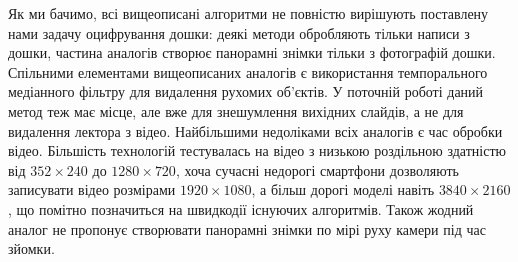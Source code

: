 \chapterConclusion

Як ми бачимо, всі вищеописані алгоритми не повністю вирішують поставлену нами задачу
оцифрування дошки: деякі методи обробляють тільки написи з дошки,
частина аналогів створює панорамні знімки тільки з фотографій дошки.
Спільними елементами вищеописаних аналогів є використання 
темпорального медіанного фільтру для видалення рухомих об'єктів.
У поточній роботі даний метод теж має місце, але вже для знешумлення
вихідних слайдів, а не для видалення лектора з відео.
Найбільшими недоліками всіх аналогів є час обробки відео.
Більшість технологій тестувалась на відео з низькою роздільною здатністю
від $352\times240$ до $1280\times720$,
хоча сучасні недорогі смартфони дозволяють записувати відео
розмірами $1920\times1080$, а більш дорогі моделі навіть $3840\times2160$,
що помітно позначиться на швидкодії існуючих алгоритмів.
Також жодний аналог не пропонує створювати панорамні знімки по мірі руху камери під
час зйомки.
